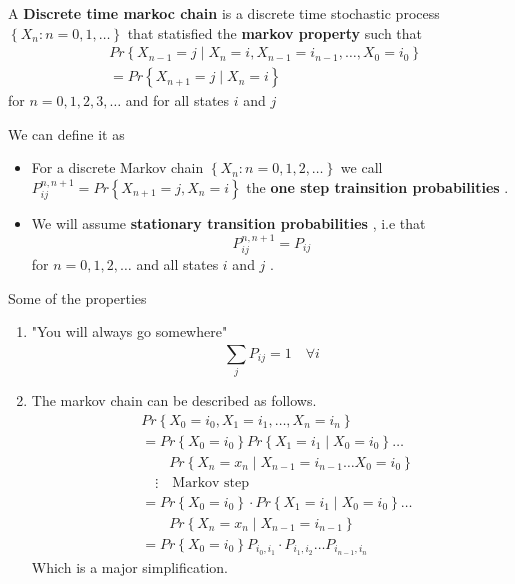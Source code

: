 \documentclass{article}
\theoremstyle{remark}
\begin{document}
\begin{definition}
  A \textbf{ Discrete time markoc chain}  is a discrete time stochastic process $\left\{ X_{n} : n = 0,1,\ldots \right\}$ that statisfied the \textbf{markov property}  such that \[
  \begin{split}
       & Pr \left \{ X_{n-1} = j  \mid  X_{n} = i ,    X_{n-1} = i_{n-1} , \ldots, X_{0} = i_{0} \right \}  \\
    &=  Pr \left \{ X_{n+1} = j  \mid  X_{n} = i \right \}  
  \end{split} 
  \] 
  for $n = 0,1,2,3, \ldots$ and for all states $i$ and $j$
\end{definition}

\begin{definition}
  We can define it  as 
  \begin{itemize}
    \item For a discrete Markov chain $\left\{ X_{n}: n= 0,1,2, \ldots \right\}$ we call $P_{ij}^{n, n+1} = Pr \left \{ X_{n+1} = j , X_{n} =i \right \} $ the \textbf{one step trainsition probabilities} . 
    \item We will assume \textbf{stationary transition probabilities} , i.e that \[
    P_{ij}^{n, n+1} = P_{ij}
    \]   for $n = 0,1,2, \ldots$ and all states $i $ and $j$ . 
  \end{itemize}
\end{definition}

Some of the properties 
\begin{enumerate}
  \item "You will always go somewhere" \[
  \sum_{j}^{}  P_{ij} = 1 \quad  \forall i 
  \] 
\item The markov chain can be described as follows. \[
    \begin{split}
  & Pr \left \{ X_{0} = i_{0} , X_{1} = i_{1}, \ldots, X_{n} = i_{n} \right \}   \\
 &=  Pr \left \{ X_{0} = i_{0}  \right \}   Pr \left \{ X_{1} = i_{1}  \mid  X_{0} = i_{0} \right \}   \ldots \\
     & \quad \quad    Pr \left \{ X_{n} = x_{n}  \mid  X_{n-1} = i_{n-1} \ldots X_{0} = i_{0} \right \}  \\
  &  \quad \vdots \quad     \text{Markov step} \\
 &=  Pr \left \{ X_{0} = i_{0}  \right \}  \cdot  Pr \left \{ X_{1} = i_{1}  \mid X_{0} = i_{0} \right \} \ldots \\
  & \quad \quad    Pr \left \{ X_{n} = x_{n}  \mid  X_{n-1} = i_{n-1} \right \}   \\
 &=  Pr \left \{ X_{0} = i_{0}  \right \} P_{i_{0}, i_{1}} \cdot  P_{i_{1}, i_{2}} \ldots P_{i_{n-1}, i_{n}}
    \end{split} 
\] 
Which is a major simplification.
\end{enumerate}
\end{document}
